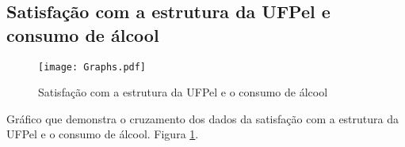 \documentclass[11pt]{scrartcl} %
\begin{document}
\subsection{Satisfação com a estrutura da UFPel e consumo de álcool}

\begin{figure}[h]
  \centering
  \texttt{[image: Graphs.pdf]}
  \label{fig:graph13}
  \caption{Satisfação com a estrutura da UFPel e o consumo de álcool}
\end{figure}

Gráfico que demonstra o cruzamento dos dados da satisfação com a estrutura da UFPel e o consumo de álcool. Figura \ref{fig:graph13}.
\end{document}
